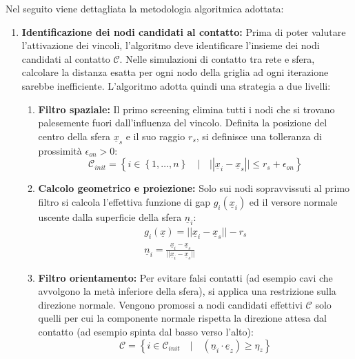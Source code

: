 Nel seguito viene dettagliata la metodologia algoritmica adottata:
\begin{enumerate}
  \item \textbf{Identificazione dei nodi candidati al contatto:}
  Prima di poter valutare l'attivazione dei vincoli, l'algoritmo deve identificare l'insieme dei nodi candidati al contatto $\mathcal{C}$. Nelle simulazioni di contatto tra rete e sfera, calcolare la distanza esatta per ogni nodo della griglia ad ogni iterazione sarebbe inefficiente. L'algoritmo adotta quindi una strategia a due livelli: 
  \begin{enumerate}[label=\alph*)]
    \item \textbf{Filtro spaziale:}
    Il primo screening elimina tutti i nodi che si trovano palesemente fuori dall'influenza del vincolo. Definita la posizione del centro della sfera $\underline{x}_s$ e il suo raggio $r_s$, si definisce una tolleranza di prossimità $\epsilon_{on} > 0$:
    \begin{equation}
      \mathcal{C}_{init} = \left\{ i \in \left\{ 1, \dots, n \right\} \quad | \quad ||\underline{x}_i - \underline{x}_s|| \leq r_s + \epsilon_{on} \right\}
    \end{equation}
    \item \textbf{Calcolo geometrico e proiezione:}
    Solo sui nodi sopravvissuti al primo filtro si calcola l'effettiva funzione di gap $g_i(\underline{x}_i)$ ed il versore normale uscente dalla superficie della sfera $\underline{n}_i$:
    \begin{equation}
      \begin{aligned}
        g_i(\underline{x}) = || \underline{x}_i -   \underline{x}_s || - r_s \\
        \underline{n}_i = \frac{\underline{x}_i - \underline{x}_s}{|| \underline{x}_i - \underline{x}_s ||}
      \end{aligned}
    \end{equation}
    \item \textbf{Filtro orientamento:}
    Per evitare falsi contatti (ad esempio cavi che avvolgono la metà inferiore della sfera), si applica una restrizione sulla direzione normale. Vengono promossi a nodi candidati effettivi $\mathcal{C}$ solo quelli per cui la componente normale rispetta la direzione attesa dal contatto (ad esempio spinta dal basso verso l'alto):
    \begin{equation}
      \mathcal{C} = \left\{ i \in \mathcal{C}_{init} \quad | \quad \left( \underline{n}_i\cdot\underline{e}_z\right) \geq \eta_z \right\}

\end{equation}
\end{enumerate}
\end{enumerate}
